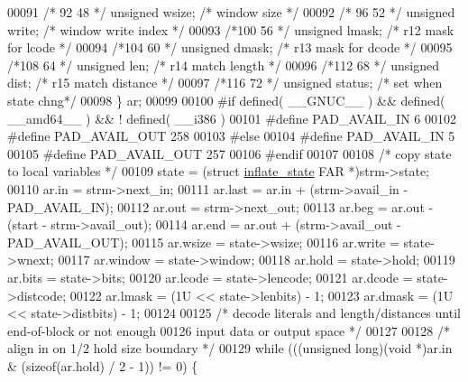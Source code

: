 \begin{DoxyCode}
{{00091 \textcolor{comment}{/* 92   48 */} \textcolor{keywordtype}{unsigned} wsize;           \textcolor{comment}{/*          window size */}
00092 \textcolor{comment}{/* 96   52 */} \textcolor{keywordtype}{unsigned} write;           \textcolor{comment}{/*          window write index */}
00093 \textcolor{comment}{/*100   56 */} \textcolor{keywordtype}{unsigned} lmask;           \textcolor{comment}{/*     r12  mask for lcode */}
00094 \textcolor{comment}{/*104   60 */} \textcolor{keywordtype}{unsigned} dmask;           \textcolor{comment}{/*     r13  mask for dcode */}
00095 \textcolor{comment}{/*108   64 */} \textcolor{keywordtype}{unsigned} len;             \textcolor{comment}{/*     r14  match length */}
00096 \textcolor{comment}{/*112   68 */} \textcolor{keywordtype}{unsigned} dist;            \textcolor{comment}{/*     r15  match distance */}
00097 \textcolor{comment}{/*116   72 */} \textcolor{keywordtype}{unsigned} status;          \textcolor{comment}{/*          set when state chng*/}
00098     \} ar;
00099 
00100 \textcolor{preprocessor}{#if defined( \_\_GNUC\_\_ ) && defined( \_\_amd64\_\_ ) && ! defined( \_\_i386 )}
00101 \textcolor{preprocessor}{#define PAD\_AVAIL\_IN 6}
00102 \textcolor{preprocessor}{#define PAD\_AVAIL\_OUT 258}
00103 \textcolor{preprocessor}{#else}
00104 \textcolor{preprocessor}{#define PAD\_AVAIL\_IN 5}
00105 \textcolor{preprocessor}{#define PAD\_AVAIL\_OUT 257}
00106 \textcolor{preprocessor}{#endif}
00107 
00108     \textcolor{comment}{/* copy state to local variables */}
00109     state = (\textcolor{keyword}{struct }\hyperlink{structinflate__state}{inflate\_state} FAR *)strm->state;
00110     ar.in = strm->next\_in;
00111     ar.last = ar.in + (strm->avail\_in - PAD\_AVAIL\_IN);
00112     ar.out = strm->next\_out;
00113     ar.beg = ar.out - (start - strm->avail\_out);
00114     ar.end = ar.out + (strm->avail\_out - PAD\_AVAIL\_OUT);
00115     ar.wsize = state->wsize;
00116     ar.write = state->wnext;
00117     ar.window = state->window;
00118     ar.hold = state->hold;
00119     ar.bits = state->bits;
00120     ar.lcode = state->lencode;
00121     ar.dcode = state->distcode;
00122     ar.lmask = (1U << state->lenbits) - 1;
00123     ar.dmask = (1U << state->distbits) - 1;
00124 
00125     \textcolor{comment}{/* decode literals and length/distances until end-of-block or not enough}
00126 \textcolor{comment}{       input data or output space */}
00127 
00128     \textcolor{comment}{/* align in on 1/2 hold size boundary */}
00129     \textcolor{keywordflow}{while} (((\textcolor{keywordtype}{unsigned} \textcolor{keywordtype}{long})(\textcolor{keywordtype}{void} *)ar.in & (\textcolor{keyword}{sizeof}(ar.hold) / 2 - 1)) != 0) \{
}}
\end{DoxyCode}
